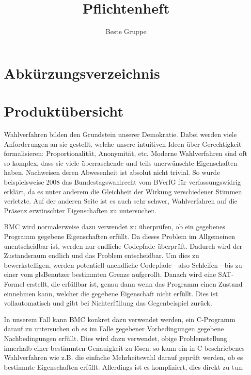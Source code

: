 \documentclass[a4paper]{scrreprt}
\begin{document}
\title{Pflichtenheft}
\author{Beste Gruppe}
\maketitle 

\tableofcontents	

\listoffigures

\chapter*{Abkürzungsverzeichnis}
\begin{acronym} %
\end{acronym}
 
\chapter{Produktübersicht}
Wahlverfahren bilden den Grundstein unserer Demokratie. Dabei werden viele Anforderungen an sie gestellt, welche unsere intuitiven Ideen über Gerechtigkeit formalisieren: Proportionalität, Anonymität, etc. Moderne Wahlverfahren sind oft so komplex, dass sie viele überraschende und teils unerwünschte Eigenschaften haben. Nachweisen deren Abwesenheit ist absolut nicht trivial. So wurde beispielsweise 2008 das Bundestagswahlrecht vom BVerfG für verfassungswidrig erklärt, da es unter anderem die Gleichheit der Wirkung verschiedener Stimmen verletzte. Auf der anderen Seite ist es auch sehr schwer, Wahlverfahren auf die Präsenz erwünschter Eigenschaften zu untersuchen.

\ac{BMC} wird normalerweise dazu verwendet zu überprüfen, ob ein gegebenes Programm gegebene Eigenschaften erfüllt. Da dieses Problem im Allgemeinen unentscheidbar ist, werden nur endliche Codepfade überprüft. Dadurch wird der Zustandsraum endlich und das Problem entscheidbar. Um dies zu bewerkstelligen, werden potentiell unendliche Codepfade - also Schleifen - bis zu einer vom gls{Benutzer} bestimmten Grenze aufgerollt. Danach wird eine SAT-Formel erstellt, die erfüllbar ist, genau dann wenn das Programm einen Zustand einnehmen kann, welcher die gegebene Eigenschaft nicht erfüllt. Dies ist vollautomatisch und gibt bei Nichterfüllung das Gegenbeispiel zurück.  

In unserem Fall kann \ac{BMC} konkret dazu verwendet werden, ein C-Programm darauf zu untersuchen ob es im Falle gegebener Vorbedingungen gegebene Nachbedingungen erfüllt. Dies wird dazu verwendet, obige Problemstellung innerhalb einer bestimmten Genauigkeit zu lösen: so kann ein in C beschriebenes Wahlverfahren wie z.B. die einfache Mehrheitswahl darauf geprüft werden, ob es bestimmte Eigenschaften erfüllt. Allerdings ist es kompliziert, dies direkt zu tun. 
\end{document}
